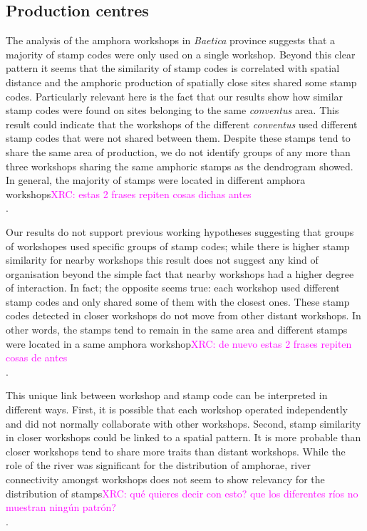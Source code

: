 \documentclass[review]{elsarticle}
\newcommand{\memo}[2]{\textcolor{#1}{#2}}
\newcommand{\xavi}[1]{\memo{magenta}{XRC: #1\\}}
\begin{document}

\subsection{Production centres}

The analysis of the amphora workshops in \textit{Baetica} province suggests that a majority of stamp codes were only used on a single workshop. Beyond this clear pattern it seems that the similarity of stamp codes is correlated with spatial distance and the amphoric production of spatially close sites shared some stamp codes. Particularly relevant here is the fact that our results show how similar stamp codes were found on sites belonging to the same \textit{conventus} area. This result could indicate that the workshops of the different \textit{conventus} used different stamp codes that were not shared between them. Despite these stamps tend to share the same area of production, we do not identify groups of any more than three workshops sharing the same amphoric stamps as the dendrogram showed. In general, the majority of stamps were located in different amphora workshops\xavi{estas 2 frases repiten cosas dichas antes}. 

Our results do not support previous working hypotheses suggesting that groups of workshopes used specific groups of stamp codes; while there is higher stamp similarity for nearby workshops this result does not suggest any kind of organisation beyond the simple fact that nearby workshops had a higher degree of interaction. In fact; the opposite seems true: each workshop used different stamp codes and only shared some of them with the closest ones. These stamp codes detected in closer workshops do not move from other distant workshops. In other words, the stamps tend to remain in the same area and different stamps were located in a same amphora workshop\xavi{de nuevo estas 2 frases repiten cosas de antes}. 

This unique link between workshop and stamp code can be interpreted in different ways. First, it is possible that each workshop operated independently and did not normally collaborate with other workshops.  Second, stamp similarity in closer workshops could be linked to a spatial pattern. It is more probable than closer workshops tend to share more traits than distant workshops. While the role of the river was significant for the distribution of amphorae, river connectivity amongst workshops does not seem to show relevancy for the distribution of stamps\xavi{qué quieres decir con esto? que los diferentes ríos no muestran ningún patrón?}.
\end{document}
